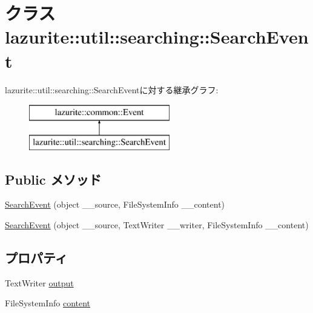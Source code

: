 \hypertarget{classlazurite_1_1util_1_1searching_1_1_search_event}{
\section{クラス lazurite::util::searching::SearchEvent}
\label{classlazurite_1_1util_1_1searching_1_1_search_event}
}
lazurite::util::searching::SearchEventに対する継承グラフ:\begin{figure}[H]
\begin{center}
\leavevmode
\includegraphics[height=2cm]{classlazurite_1_1util_1_1searching_1_1_search_event}
\end{center}
\end{figure}
\subsection*{Public メソッド}
\begin{DoxyCompactItemize}
\item 
\hyperlink{classlazurite_1_1util_1_1searching_1_1_search_event_a30ec549414885afdea9a28482858a477}{SearchEvent} (object \_\-\_\-source, FileSystemInfo \_\-\_\-content)
\item 
\hyperlink{classlazurite_1_1util_1_1searching_1_1_search_event_abd519797dff87df425c2e66257394b70}{SearchEvent} (object \_\-\_\-source, TextWriter \_\-\_\-writer, FileSystemInfo \_\-\_\-content)
\end{DoxyCompactItemize}
\subsection*{プロパティ}
\begin{DoxyCompactItemize}
\item 
TextWriter \hyperlink{classlazurite_1_1util_1_1searching_1_1_search_event_add285e50dbd066c93d08cf646589608b}{output}
\item 
FileSystemInfo \hyperlink{classlazurite_1_1util_1_1searching_1_1_search_event_a9ff4ceac01438f89d4556e0af4b9ea3f}{content}
\end{DoxyCompactItemize}


